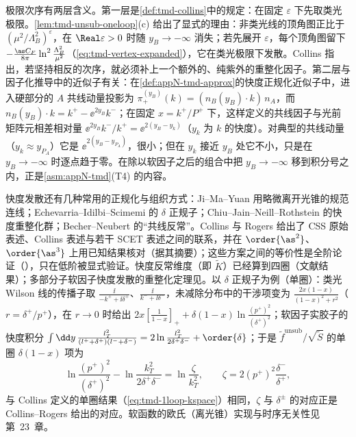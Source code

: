 \begin{remark}[极限次序]\label{rem:tmd-order-of-limits}
极限次序有两层含义。第一层是\cref{def:tmd-collins}中的规定：在固定 $\varepsilon$ 下先取类光极限。\cref{lem:tmd-unsub-oneloop}(c) 给出了显式的理由：非类光线的顶角图正比于 $(\mu^2/\Lambda_B^2)^\varepsilon$，在 $\Real\varepsilon>0$ 时随 $y_B\to-\infty$ 消失；若先展开 $\varepsilon$，每个顶角图留下 $-\frac{\as C_F}{8\pi}\ln^2\frac{\Lambda_B^2}{\mu^2}$（\cref{eq:tmd-vertex-expanded}），它在类光极限下发散。Collins 指出，若坚持相反的次序，就必须补上一个额外的、纯紫外的重整化因子\cite[式~(10.97)]{Collins2011}。第二层与因子化推导中的近似子有关：在\cref{def:appN-tmd-approx}的快度正规化近似子中，进入硬部分的 $A$ 共线动量投影为 $\pi_+^{(y_B)}(k)=(n_B(y_B)\cdot k)\,n_A$，而 $n_B(y_B)\cdot k=k^+-\ee^{2y_B}k^-$；在固定 $x=k^+/P^+$ 下，这样定义的共线因子与光前矩阵元相差相对量 $\ee^{2y_B}k^-/k^+=\ee^{2(y_B-y_k)}$（$y_k$ 为 $k$ 的快度）。对典型的共线动量（$y_k\approx y_{P_A}$）它是 $\ee^{2(y_B-y_{P_A})}$，很小；但在 $y_k$ 接近 $y_B$ 处它不小，只是在 $y_B\to-\infty$ 时逐点趋于零。在除以软因子之后的组合中把 $y_B\to-\infty$ 移到积分号之内，正是\cref{asm:appN-tmd}(T4) 的内容。%
\end{remark}

\begin{remark}[其他方案]\label{rem:tmd-schemes}
快度发散还有几种常用的正规化与组织方式：Ji--Ma--Yuan 用略微离开光锥的规范连线\cite{JiMaYuan2005,Ji:2004xq,Ji:2005nu}；Echevarria--Idilbi--Scimemi 的 $\delta$ 正规子\cite{EchevarriaIdilbiScimemi2012,Echevarria:2012js}；Chiu--Jain--Neill--Rothstein 的快度重整化群\cite{ChiuEtAl2012a,ChiuEtAl2012b}；Becher--Neubert 的“共线反常”\cite{BecherNeubert2011}。Collins 与 Rogers 给出了 CSS 原始表述、Collins 表述与若干 SCET 表述之间的联系，并在 $\order{\as^2}$、$\order{\as^3}$ 上用已知结果核对\cite{Collins:2017oxh}（据其摘要）；这些方案之间的等价性是全阶论证（\tagA），只在低阶被显式验证。快度反常维度（即 $\tilde K$）已经算到四圈\cite{Duhr:2022yyp,Moult:2022xzt}（文献结果）；多部分子软因子快度发散的重整化定理见\cite{Vladimirov:2017ksc}。以 $\delta$ 正规子为例（单圈）：类光 Wilson 线的传播子取 $\frac{\ii}{-k^++\ii\delta^+}$、$\frac{\ii}{k^-+\ii\delta^-}$，未减除分布中的干涉项变为 $\frac{2x(1-x)}{(1-x)^2+r^2}$（$r=\delta^+/p^+$），在 $r\to0$ 时给出 $2x[\frac1{1-x}]_++\delta(1-x)\ln\frac{(p^+)^2}{(\delta^+)^2}$；软因子实胶子的快度积分 $\int\dd y\,\frac{l_T^2}{(l^++\delta^+)(l^-+\delta^-)}=2\ln\frac{l_T^2}{2\delta^+\delta^-}+\order{\delta}$；于是 $\tilde f^{\mathrm{unsub}}/\sqrt{\tilde S}$ 的单圈 $\delta(1-x)$ 项为
\begin{equation}\label{eq:tmd-delta-reg}
\ln\frac{(p^+)^2}{(\delta^+)^2}-\ln\frac{k_T^2}{2\delta^+\delta^-}=\ln\frac{\zeta}{k_T^2},\qquad\zeta=2(p^+)^2\frac{\delta^-}{\delta^+},
\end{equation}
与 Collins 定义的单圈结果（\cref{eq:tmd-1loop-kspace}）相同，$\zeta$ 与 $\delta^\pm$ 的对应正是 Collins--Rogers 给出的对应\cite{Collins:2012uy}。软函数的欧氏（离光锥）实现与时序无关性见第~23~章。
\end{remark}

